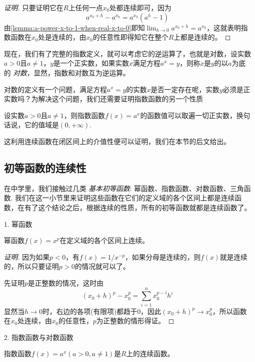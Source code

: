 \begin{proof}[证明]
  只要证明它在$R$上任何一点$x_0$处都连续即可，因为
  \[ a^{x_0+h} - a^{x_0} = a^{x_0}(a^h-1) \]
  由\autoref{lemma:a-power-x-to-1-when-real-x-to-0}即知$\lim_{h \to 0} a^{x_0+h} = a^{x_0}$，这就表明指数函数在$x_0$处是连续的，由$x_0$的任意性即得知它在整个$R$上都是连续的。
\end{proof}

现在，我们有了完整的指数定义，就可以考虑它的逆运算了，也就是对数，设实数$a>0$且$a \neq 1$，$y$是一个正实数，如果实数$x$满足方程$a^x=y$，则称$x$是$y$的以$a$为底的 \emph{对数}，显然，指数和对数互为逆运算。

对数的定义有一个问题，满足方程$a^x=y$的实数$x$是否一定存在呢，实数$y$必须是正实数吗？为解决这个问题，我们还需要证明指数函数的另一个性质
\begin{theorem}
  设实数$a>0$且$a \neq 1$，则指数函数$f(x)=a^x$的函数值可以取遍一切正实数，换句话说，它的值域是$(0,+\infty)$.
\end{theorem}

这利用连续函数在闭区间上的介值性便可以证明，我们在本节的后文给出。

\subsection{初等函数的连续性}
\label{sec:continuousness-of-elementary-function}


在中学里，我们接触过几类 \emph{基本初等函数}: 幂函数、指数函数、对数函数、三角函数. 我们在这一小节里来证明这些函数在它们的定义域的各个区间上都是连续函数，在有了这个结论之后，根据连续的性质，所有的初等函数就都是连续函数了。

1. 幂函数
\begin{theorem}
  幂函数$f(x)=x^p$在定义域的各个区间上连续。
\end{theorem}

\begin{proof}[证明]
  因为如果$p<0$，有$f(x)=1/x^{-p}$，如果分母是连续的，则$f(x)$就是连续的，所以只要证明$p>0$的情况就可以了。

  先证明$p$是正整数的情况，这时由
  \[ (x_0+h)^p-x_0^p = \sum_{i=1}^nx_0^{p-i}h^i \]
  显然当$h \to 0$时，右边的各项(有限项)都趋于0，因此$(x_0+h)^p \to x_0^p$，所以函数在$x_0$处连续，由$x_0$的任意性，$p$为正整数的情形得证。
\end{proof}

2. 指数函数与对数函数
\begin{theorem}
  指数函数$f(x)=a^x(a>0,a\neq 1)$是$R$上的连续函数。
\end{theorem}

